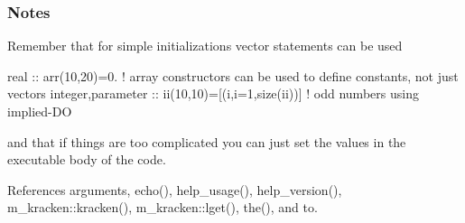 \subsubsection*{Notes}

Remember that for simple initializations vector statements can be used

real \+:\+: arr(10,20)=0. ! array constructors can be used to define constants, not just vectors integer,parameter \+:\+: ii(10,10)=\mbox{[}(i,i=1,size(ii))\mbox{]} ! odd numbers using implied-\/\+DO

and that if things are too complicated you can just set the values in the executable body of the code. 

References arguments, echo(), help\+\_\+usage(), help\+\_\+version(), m\+\_\+kracken\+::kracken(), m\+\_\+kracken\+::lget(), the(), and to.

